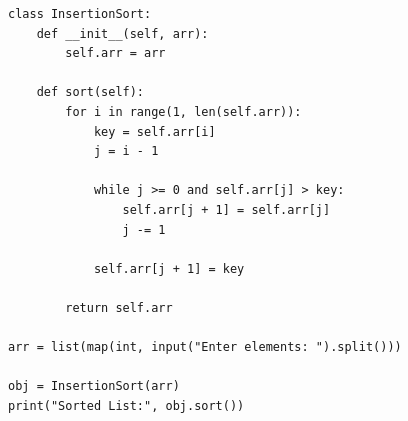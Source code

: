 \begin{verbatim}
class InsertionSort:
    def __init__(self, arr):
        self.arr = arr

    def sort(self):
        for i in range(1, len(self.arr)):
            key = self.arr[i]
            j = i - 1

            while j >= 0 and self.arr[j] > key:
                self.arr[j + 1] = self.arr[j]
                j -= 1

            self.arr[j + 1] = key

        return self.arr

arr = list(map(int, input("Enter elements: ").split()))

obj = InsertionSort(arr)
print("Sorted List:", obj.sort())
\end{verbatim}